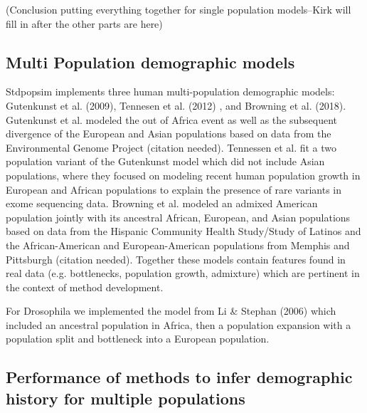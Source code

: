\documentclass[12pt,halfline,a4paper]{ouparticle}
\begin{document}
(Conclusion putting everything together for single population models--Kirk will
fill in after the other parts are here)


\subsection*{Multi Population demographic models}
Stdpopsim implements three human multi-population demographic models: Gutenkunst
et al. (2009), Tennesen et al. (2012) , and Browning et al. (2018). Gutenkunst
et al. modeled the out of Africa event as well as the subsequent divergence of
the European and Asian populations based on data from the Environmental Genome
Project (citation needed). Tennessen et al. fit a two population variant of the
Gutenkunst model which did not include Asian populations, where they focused on
modeling recent human population growth in European and African populations to
explain the presence of rare variants in exome sequencing data. Browning et al.
modeled an admixed American population jointly with its ancestral African,
European, and Asian populations based on data from the Hispanic Community Health
Study/Study of Latinos and the African-American and European-American
populations from Memphis and Pittsburgh (citation needed). Together these models
contain features found in real data (e.g. bottlenecks, population growth,
admixture) which are pertinent in the context of method development.

For Drosophila we implemented the model from Li & Stephan (2006) which included
an ancestral population in Africa, then a population expansion with a population
split and bottleneck into a European population.

\subsection*{Performance of methods to infer demographic history for multiple
populations}
\end{document}
